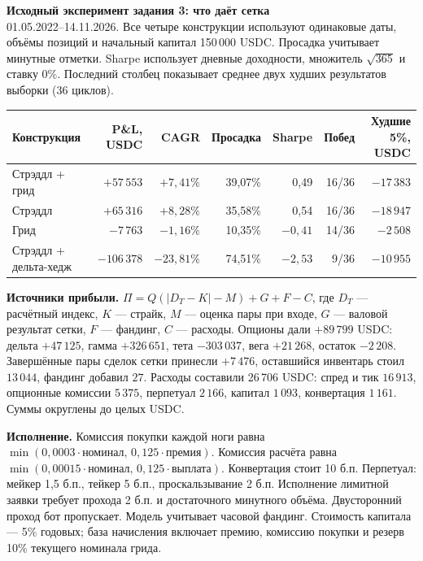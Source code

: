 \documentclass[12pt,a4paper]{article}
\newcommand{\sub}[1]{\par\textbf{#1.}\enspace\ignorespaces}
\begin{document}
\pagestyle{plain}

\newpage
\fontsize{11.5}{13.7}\selectfont\setlength{\parskip}{4pt}\setlength{\tabcolsep}{5pt}
\textbf{\large Исходный эксперимент задания 3: что даёт сетка}\\[2pt]
01.05.2022--14.11.2026. Все четыре конструкции используют одинаковые даты, объёмы позиций и начальный капитал 150\,000 USDC. Просадка учитывает минутные отметки. Sharpe использует дневные доходности, множитель $\sqrt{365}$ и ставку 0\%. Последний столбец показывает среднее двух худших результатов выборки (36 циклов).
\begin{center}\normalsize
\begin{tabular}{@{}lrrrrrr@{}}\toprule
Конструкция & P\&L, USDC & CAGR & Просадка & Sharpe & Побед & Худшие 5\%, USDC\\\midrule
Стрэддл + грид & $+57\,553$ & $+7{,}41\%$ & 39,07\% & 0,49 & 16/36 & $-17\,383$\\
Стрэддл & $+65\,316$ & $+8{,}28\%$ & 35,58\% & 0,54 & 16/36 & $-18\,947$\\
Грид & $-7\,763$ & $-1{,}16\%$ & 10,35\% & $-0{,}41$ & 14/36 & $-2\,508$\\
Стрэддл + дельта-хедж & $-106\,378$ & $-23{,}81\%$ & 74,51\% & $-2{,}53$ & 9/36 & $-10\,955$\\\bottomrule
\end{tabular}\end{center}
\sub{Источники прибыли} $\Pi=Q(|D_T-K|-M)+G+F-C$, где $D_T$ --- расчётный индекс, $K$ --- страйк, $M$ --- оценка пары при входе, $G$ --- валовой результат сетки, $F$ --- фандинг, $C$ --- расходы. Опционы дали $+89\,799$ USDC: дельта $+47\,125$, гамма $+326\,651$, тета $-303\,037$, вега $+21\,268$, остаток $-2\,208$. Завершённые пары сделок сетки принесли $+7\,476$, оставшийся инвентарь стоил $13\,044$, фандинг добавил $27$. Расходы составили 26\,706 USDC: спред и тик $16\,913$, опционные комиссии $5\,375$, перпетуал $2\,166$, капитал $1\,093$, конвертация $1\,161$. Суммы округлены до целых USDC.
\sub{Исполнение} Комиссия покупки каждой ноги равна $\min(0{,}0003\cdot\text{номинал},\,0{,}125\cdot\text{премия})$. Комиссия расчёта равна $\min(0{,}00015\cdot\text{номинал},\,0{,}125\cdot\text{выплата})$. Конвертация стоит 10 б.п. Перпетуал: мейкер 1,5 б.п., тейкер 5 б.п., проскальзывание 2 б.п. Исполнение лимитной заявки требует прохода 2 б.п. и достаточного минутного объёма. Двусторонний проход бот пропускает. Модель учитывает часовой фандинг. Стоимость капитала --- 5\% годовых; база начисления включает премию, комиссию покупки и резерв 10\% текущего номинала грида.
\end{document}
